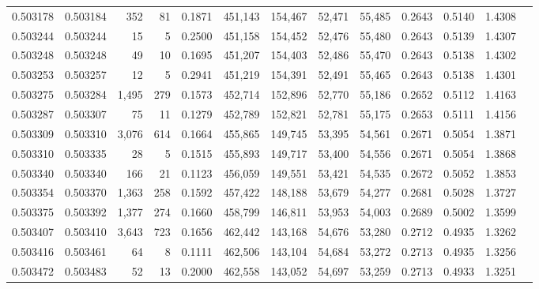 \begin{tabular}{rrrrrrrrrrrrr}
0.503178 & 0.503184 &   352 &    81 &                                     0.1871 & 451,143 & 154,467 &  52,471 &  55,485 & 0.2643 & 0.5140 & 1.4308 \\
0.503244 & 0.503244 &    15 &     5 &                                     0.2500 & 451,158 & 154,452 &  52,476 &  55,480 & 0.2643 & 0.5139 & 1.4307 \\
0.503248 & 0.503248 &    49 &    10 &                                     0.1695 & 451,207 & 154,403 &  52,486 &  55,470 & 0.2643 & 0.5138 & 1.4302 \\
0.503253 & 0.503257 &    12 &     5 &                                     0.2941 & 451,219 & 154,391 &  52,491 &  55,465 & 0.2643 & 0.5138 & 1.4301 \\
0.503275 & 0.503284 & 1,495 &   279 &                                     0.1573 & 452,714 & 152,896 &  52,770 &  55,186 & 0.2652 & 0.5112 & 1.4163 \\
0.503287 & 0.503307 &    75 &    11 &                                     0.1279 & 452,789 & 152,821 &  52,781 &  55,175 & 0.2653 & 0.5111 & 1.4156 \\
0.503309 & 0.503310 & 3,076 &   614 &                                     0.1664 & 455,865 & 149,745 &  53,395 &  54,561 & 0.2671 & 0.5054 & 1.3871 \\
0.503310 & 0.503335 &    28 &     5 &                                     0.1515 & 455,893 & 149,717 &  53,400 &  54,556 & 0.2671 & 0.5054 & 1.3868 \\
0.503340 & 0.503340 &   166 &    21 &                                     0.1123 & 456,059 & 149,551 &  53,421 &  54,535 & 0.2672 & 0.5052 & 1.3853 \\
0.503354 & 0.503370 & 1,363 &   258 &                                     0.1592 & 457,422 & 148,188 &  53,679 &  54,277 & 0.2681 & 0.5028 & 1.3727 \\
0.503375 & 0.503392 & 1,377 &   274 &                                     0.1660 & 458,799 & 146,811 &  53,953 &  54,003 & 0.2689 & 0.5002 & 1.3599 \\
0.503407 & 0.503410 & 3,643 &   723 &                                     0.1656 & 462,442 & 143,168 &  54,676 &  53,280 & 0.2712 & 0.4935 & 1.3262 \\
0.503416 & 0.503461 &    64 &     8 &                                     0.1111 & 462,506 & 143,104 &  54,684 &  53,272 & 0.2713 & 0.4935 & 1.3256 \\
0.503472 & 0.503483 &    52 &    13 &                                     0.2000 & 462,558 & 143,052 &  54,697 &  53,259 & 0.2713 & 0.4933 & 1.3251 \\

\end{tabular}
